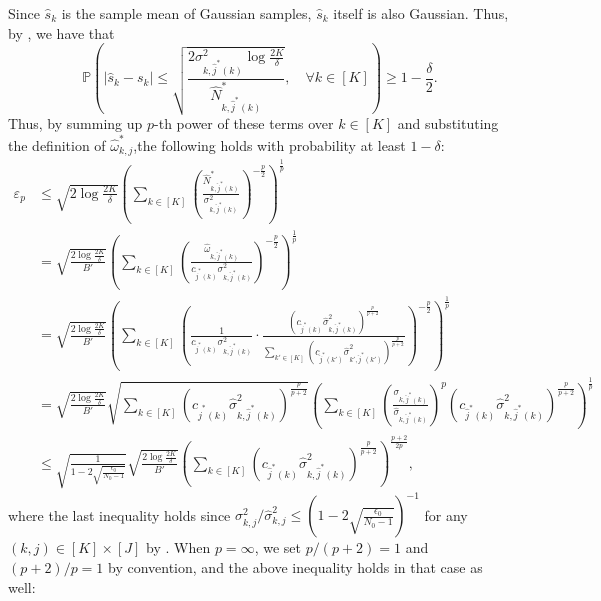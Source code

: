 \documentclass{article}
\def\sP{{\mathbb{P}}}
\theoremstyle{plain}
\theoremstyle{definition}
\theoremstyle{plain}
\begin{document}
Since $\hat{s}_k$ is the sample mean of Gaussian samples, $\hat{s}_k$ itself is also Gaussian.
Thus, by , we have that
\begin{equation}
    \sP\left( | \hat{s}_k - s_k | \leq \sqrt{\frac{2 \sigma_{k,\hat{j}^*(k)}^2 \log \frac{2K}{\delta}}{\widehat{N}_{k,\hat{j}^*(k)}^*}}, \quad \forall k \in [K] \right) \geq 1 - \frac{\delta}{2}.
\end{equation}
Thus, by summing up $p$-th power of these terms over $k\in[K]$ and substituting the definition of $\widehat{\omega}_{k,j}^*$,the following holds with probability at least $1 - \delta$:
\begin{align}
    \varepsilon_p & \leq \sqrt{2\log \frac{2K}{\delta}} \left( \sum_{k\in[K]} \left( \frac{\widehat{N}_{k,\hat{j}^*(k)}^*}{\sigma_{k,\hat{j}^*(k)}^2} \right)^{-\frac{p}{2}}\right)^{\frac{1}{p}}\\
    & = \sqrt{\frac{2\log \frac{2K}{\delta}}{B'}} \left( \sum_{k\in[K]} \left( \frac{\widehat{\omega}_{k,\hat{j}^*(k)}}{c_{\hat{j}^*(k)} \sigma_{k,\hat{j}^*(k)}^2} \right)^{-\frac{p}{2}}\right)^{\frac{1}{p}}\\
    & = \sqrt{\frac{2\log \frac{2K}{\delta}}{B'}} \left( \sum_{k\in[K]} \left( \frac{1}{c_{\hat{j}^*(k)} \sigma_{k,\hat{j}^*(k)}^2}\cdot \frac{\left(c_{\hat{j}^*(k)} \hat{\sigma}_{k, \hat{j}^*(k)}^2 \right)^{\frac{p}{p+2}}}{\sum_{k'\in[K]} \left( c_{\hat{j}^*(k')} \hat{\sigma}_{k', \hat{j}^*(k')}^2 \right)^{\frac{p}{p+2}}} \right)^{-\frac{p}{2}}\right)^{\frac{1}{p}}\\
    & = \sqrt{\frac{2\log\frac{2K}{\delta}}{B'}}\sqrt{\sum_{k\in[K]} \left( c_{\hat{j}^*(k)} \hat{\sigma}_{k,\hat{j}^*(k)}^2 \right)^{\frac{p}{p+2}}} \left( \sum_{k\in[K]} \left(\frac{\sigma_{k,\hat{j}^*(k)}}{\hat{\sigma}_{k,\hat{j}^*(k)}}\right)^p \left( c_{\hat{j}^*(k)} \hat{\sigma}_{k,\hat{j}^*(k)}^2 \right)^{\frac{p}{p+2}} \right)^{\frac{1}{p}}\\
    & \leq \sqrt{\frac{1}{1 - 2\sqrt{\frac{\epsilon_0}{N_0-1}}}} \sqrt{\frac{2\log\frac{2K}{\delta}}{B'}} \left( \sum_{k\in[K]} \left( c_{\hat{j}^*(k)} \hat{\sigma}_{k,\hat{j}^*(k)}^2 \right)^{\frac{p}{p+2}} \right)^{\frac{p+2}{2p}},
\end{align}
where the last inequality holds since $\sigma_{k,j}^2 / \hat{\sigma}_{k,j}^2 \leq \left(1 - 2\sqrt{\frac{\epsilon_0}{N_0-1}}\right)^{-1} $ for any $(k,j) \in [K] \times [J]$ by .
When $p = \infty$, we set $p/(p+2)=1$ and $(p+2)/p=1$ by convention, and the above inequality holds in that case as well:
\end{document}
